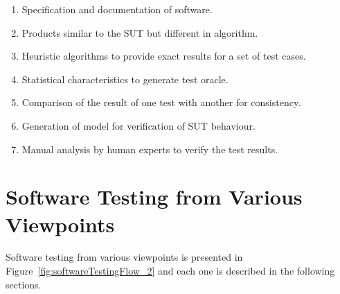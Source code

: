 \begin{enumerate}
\item Specification and documentation of software.
\item Products similar to the SUT but different in algorithm. %
\item Heuristic algorithms to provide exact results for a set of test cases. %
\item Statistical characteristics to generate test oracle. %
\item Comparison of the result of one test with another for consistency. %
\item Generation of model for verification of SUT behaviour. %
\item Manual analysis by human experts to verify the test results. %
\end{enumerate}

\section{Software Testing from Various Viewpoints}
Software testing from various viewpoints is presented in Figure~\ref{fig:softwareTestingFlow_2} and each one is described in the following sections.

